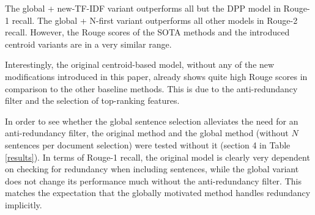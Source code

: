 \documentclass[11pt,letterpaper]{article}
\begin{document}
The global + new-TF-IDF variant outperforms all but the DPP model in Rouge-1 recall. The global + N-first variant outperforms all other models in Rouge-2 recall. However, the Rouge scores of the SOTA methods and the introduced centroid variants are in a very similar range. 

Interestingly, the original centroid-based model, without any of the new modifications introduced in this paper, already shows quite high Rouge scores in comparison to the other baseline methods. This is due to the anti-redundancy filter and the selection of top-ranking features.

In order to see whether the global sentence selection alleviates the need for an anti-redundancy filter, the original method and the global method (without $N$ sentences per document selection) were tested without it (section 4 in Table \ref{results}). In terms of Rouge-1 recall, the original model is clearly very dependent on checking for redundancy when including sentences, while the global variant does not change its performance much without the anti-redundancy filter. This matches the expectation that the globally motivated method handles redundancy implicitly.
\end{document}
